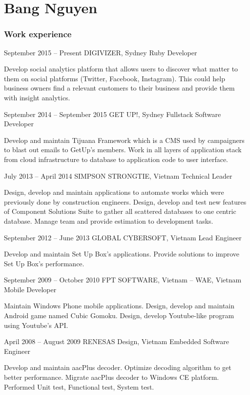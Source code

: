 \documentclass{tccv}
\begin{document}
\part{Bang Nguyen}

\section{Work experience}

\begin{eventlist}

\item{September 2015 -- Present}
     {DIGIVIZER, Sydney}
     {Ruby Developer}

Develop social analytics platform that allows users to discover
what matter to them on social platforms (Twitter, Facebook, Instagram).
This could help business owners find a relevant customers
to their business and provide them with insight analytics.

\item{September 2014 -- September 2015}
     {GET UP!, Sydney}
     {Fullstack Software Developer}

Develop and maintain Tijuana Framework which is a CMS
used by campaigners to blast out emails to GetUp's members.
Work in all layers of application stack from cloud infrastructure
to database to application code to user interface.

\item{July 2013 -- April 2014}
     {SIMPSON STRONGTIE, Vietnam}
     {Technical Leader}

Design, develop and maintain applications to automate works which were previously done by construction engineers.
Design, develop and test new features of Component Solutions Suite to gather all scattered databases to one centric database.
Manage team and provide estimation to development tasks.

\item{September 2012 -- June 2013}
     {GLOBAL CYBERSOFT, Vietnam}
     {Lead Engineer}

Develop and maintain Set Up Box's applications.
Provide solutions to improve Set Up Box's performance.

\item{September 2009 -- October 2010}
     {FPT SOFTWARE, Vietnam -- WAE, Vietnam}
     {Mobile Developer}

Maintain Windows Phone mobile applications.
\newline Design, develop and maintain Android game named Cubic Gomoku.
\newline Design, develop Youtube-like program using Youtube's API.

\item{April 2008 -- August 2009}
     {RENESAS Design, Vietnam}
     {Embedded Software Engineer}

Develop and maintain aacPlus decoder.
Optimize decoding algorithm to get better performance.
Migrate aacPlus decoder to Windows CE platform.
Performed Unit test, Functional test, System test.

\end{eventlist}
\end{document}
